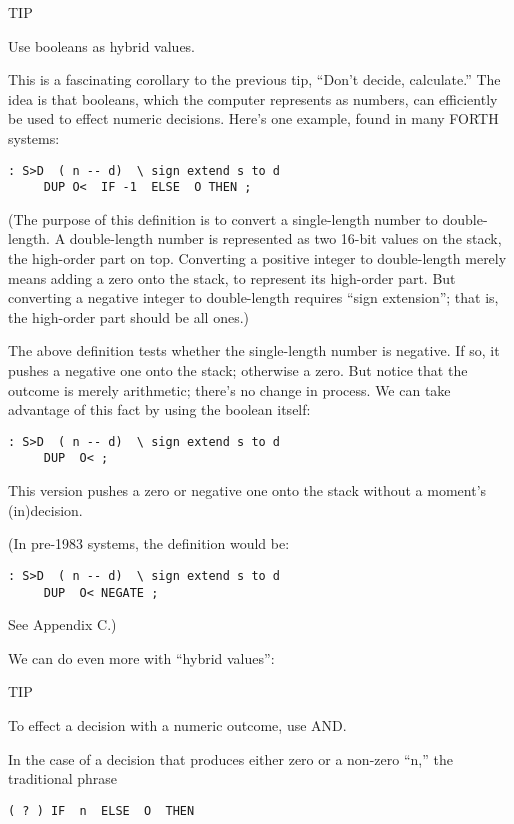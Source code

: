 TIP

Use booleans as hybrid values.

This is a fascinating corollary to the previous tip, ``Don't decide,
calculate.'' The idea is that booleans, which the computer represents as
numbers, can efficiently be used to effect numeric decisions. Here's one
example, found in many FORTH systems:

\begin{verbatim}
: S>D  ( n -- d)  \ sign extend s to d
     DUP O<  IF -1  ELSE  O THEN ;
\end{verbatim}

(The purpose of this definition is to convert a single-length number to
double-length. A double-length number is represented as two 16-bit
values on the stack, the high-order part on top. Converting a positive
integer to double-length merely means adding a zero onto the stack, to
represent its high-order part. But converting a negative integer to
double-length requires ``sign extension''; that is, the high-order part
should be all ones.)

The above definition tests whether the single-length number is
negative. If so, it pushes a negative one onto the stack; otherwise a zero.
But notice that the outcome is merely arithmetic; there's no change
in process. We can take advantage of this fact by using the boolean itself:

\begin{verbatim}
: S>D  ( n -- d)  \ sign extend s to d
     DUP  O< ;
\end{verbatim}

This version pushes a zero or negative one onto the stack without a
moment's (in)decision.

(In pre-1983 systems, the definition would be:

\begin{verbatim}
: S>D  ( n -- d)  \ sign extend s to d
     DUP  O< NEGATE ;
\end{verbatim}

See Appendix C.)

We can do even more with ``hybrid values'':

TIP

To effect a decision with a numeric outcome, use AND.

In the case of a decision that produces either zero or a non-zero ``n,'' the
traditional phrase

\begin{verbatim}
( ? ) IF  n  ELSE  O  THEN
\end{verbatim}

